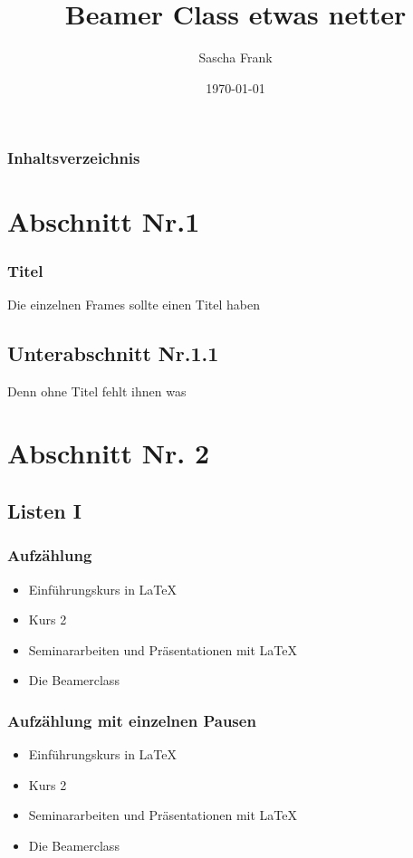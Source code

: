 \documentclass[hyperref={pdfpagelabels=false}]{beamer}
\title{Beamer Class etwas netter}
\author{Sascha Frank}
\date{\today}
\begin{document}
\begin{frame}
\titlepage
\end{frame} 

\begin{frame}
\frametitle{Inhaltsverzeichnis}
\tableofcontents
\end{frame} 


\section{Abschnitt Nr.1} 
\begin{frame}
\frametitle{Titel} 
Die einzelnen Frames sollte einen Titel haben 
\end{frame}
\subsection{Unterabschnitt Nr.1.1  }
\begin{frame} 
Denn ohne Titel fehlt ihnen was
\end{frame}


\section{Abschnitt Nr. 2} 
\subsection{Listen I}
\begin{frame}
\frametitle{Aufz\"ahlung}
\begin{itemize}
\item Einf\"uhrungskurs in \LaTeX{}  
\item Kurs 2  
\item Seminararbeiten und Pr\"asentationen mit \LaTeX{} 
\item Die Beamerclass 
\end{itemize} 
\end{frame}

\begin{frame}
\frametitle{Aufz\"ahlung mit einzelnen Pausen}
\begin{itemize}
\item  Einf\"uhrungskurs in \LaTeX{} \pause 
\item  Kurs 2 \pause 
\item  Seminararbeiten und Pr\"asentationen mit \LaTeX{} \pause 
\item  Die Beamerclass
\end{itemize} 
\end{frame}
\end{document}
